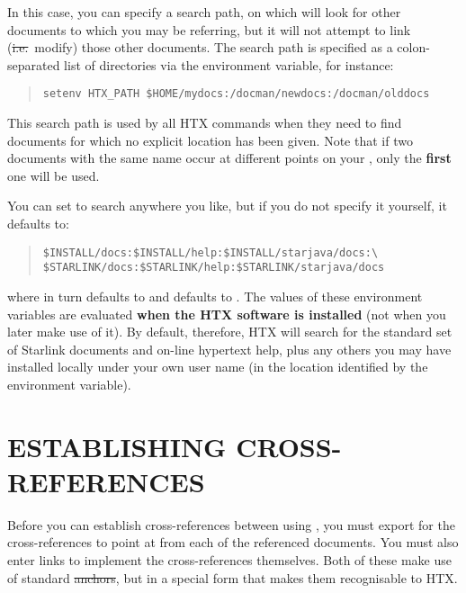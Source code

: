 In this case, you can specify a search path, on which 
will look for other documents to which you may be referring, but it
will not attempt to link (\st{i.e.}\ modify) those other
documents. The search path is specified as a colon-separated list of
directories via the  environment variable, for instance:

\begin{quote}
\begin{verbatim}
setenv HTX_PATH $HOME/mydocs:/docman/newdocs:/docman/olddocs
\end{verbatim}
\end{quote}

This search path is used by all HTX commands when they need to find
documents for which no explicit location has been given.  Note that if
two documents with the same name occur at different points on your
, only the {\bf first} one will be used.

You can set  to search anywhere you like, but if you do not
specify it yourself, it defaults to:

\begin{quote}
\begin{verbatim}
$INSTALL/docs:$INSTALL/help:$INSTALL/starjava/docs:\
$STARLINK/docs:$STARLINK/help:$STARLINK/starjava/docs
\end{verbatim}
\end{quote}

where  in turn defaults to  and
 defaults to . The values of these environment
variables are evaluated {\bf when the HTX software is installed} (not
when you later make use of it). By default, therefore, HTX will search
for the standard set of Starlink documents and on-line hypertext help,
plus any others you may have installed locally under your own user
name (in the location identified by the \hi{INSTALL} environment
variable).

\section{\label{sect:crossreferences}ESTABLISHING CROSS-REFERENCES}

Before you can establish cross-references between 
using \HTXref{HTX}, you must export \labref{labelled targets} for the
cross-references to point at from each of the referenced
documents. You must also enter links to implement the cross-references
themselves. Both of these make use of standard \HTMLref{HTML}
\st{anchors}, but in a special form that makes them recognisable to
HTX.

